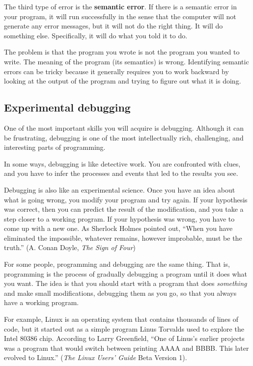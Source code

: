 \documentclass[10pt]{book}
\begin{document}
The third type of error is the {\bf semantic error}.  If there is a semantic error in your program, it will 
run successfully in the sense that the computer will not generate any error messages, but it will not do the 
right thing.  It will do something else.  Specifically, it will do what you told it to do.

The problem is that the program you wrote is not the program you wanted to write.  The meaning of the program 
(its semantics) is wrong. Identifying semantic errors can be tricky because it generally requires you to work 
backward by looking at the output of the program and trying to figure out what it is doing.

\subsection{Experimental debugging}

One of the most important skills you will acquire is debugging. Although it can be frustrating, debugging is one 
of the most intellectually rich, challenging, and interesting parts of programming.


In some ways, debugging is like detective work.  You are confronted with clues, and you have to infer the processes 
and events that led to the results you see.

Debugging is also like an experimental science.  Once you have an idea about what is going wrong, you modify your 
program and try again.  If your hypothesis was correct, then you can predict the result of the modification, and 
you take a step closer to a working program.  If your hypothesis was wrong, you have to come up with a new one.  
As Sherlock Holmes pointed out, ``When you have eliminated the impossible, whatever remains, however improbable, 
must be the truth.'' (A. Conan Doyle, {\em The Sign of Four})


For some people, programming and debugging are the same thing.  That is, programming is the process of gradually 
debugging a program until it does what you want.  The idea is that you should start with a program that does {\em 
something} and make small modifications, debugging them as you go, so that you always have a working program.

For example, Linux is an operating system that contains thousands of lines of code, but it started out as a simple 
program Linus Torvalds used to explore the Intel 80386 chip.  According to Larry Greenfield, ``One of Linus's 
earlier projects was a program that would switch between printing AAAA and BBBB.  This later evolved to Linux.'' 
({\em The Linux Users' Guide} Beta Version 1).
\end{document}
